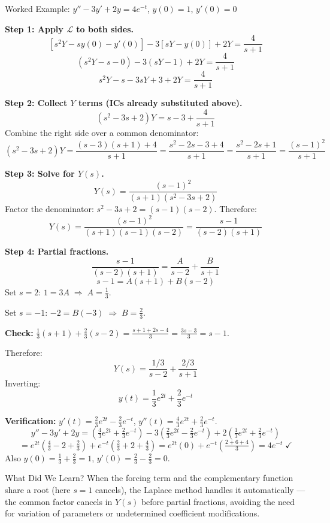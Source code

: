 \documentclass[12pt,a4paper]{article}
\begin{document}
\begin{infobox}{Worked Example: $y'' - 3y' + 2y = 4e^{-t}$, $y(0)=1$, $y'(0)=0$}

\textbf{Step 1: Apply $\mathcal{L}$ to both sides.}
\[
[s^2Y - sy(0) - y'(0)] - 3[sY - y(0)] + 2Y = \frac{4}{s+1}
\]
\[
(s^2Y - s - 0) - 3(sY - 1) + 2Y = \frac{4}{s+1}
\]
\[
s^2Y - s - 3sY + 3 + 2Y = \frac{4}{s+1}
\]

\textbf{Step 2: Collect $Y$ terms (ICs already substituted above).}
\[
(s^2 - 3s + 2)Y = s - 3 + \frac{4}{s+1}
\]
Combine the right side over a common denominator:
\[
(s^2-3s+2)Y = \frac{(s-3)(s+1) + 4}{s+1} = \frac{s^2-2s-3+4}{s+1} = \frac{s^2-2s+1}{s+1} = \frac{(s-1)^2}{s+1}
\]

\textbf{Step 3: Solve for $Y(s)$.}
\[
Y(s) = \frac{(s-1)^2}{(s+1)(s^2-3s+2)}
\]
Factor the denominator: $s^2-3s+2 = (s-1)(s-2)$. Therefore:
\[
Y(s) = \frac{(s-1)^2}{(s+1)(s-1)(s-2)} = \frac{s-1}{(s-2)(s+1)}
\]

\textbf{Step 4: Partial fractions.}
\[
\frac{s-1}{(s-2)(s+1)} = \frac{A}{s-2} + \frac{B}{s+1}
\]
\[
s-1 = A(s+1) + B(s-2)
\]
Set $s=2$: $1 = 3A \;\Rightarrow\; A = \tfrac{1}{3}$.

Set $s=-1$: $-2 = B(-3) \;\Rightarrow\; B = \tfrac{2}{3}$.

\textbf{Check:} $\tfrac{1}{3}(s+1)+\tfrac{2}{3}(s-2) = \tfrac{s+1+2s-4}{3} = \tfrac{3s-3}{3}=s-1$. \checkmark

Therefore:
\[
Y(s) = \frac{1/3}{s-2} + \frac{2/3}{s+1}
\]
Inverting:
\[
\boxed{y(t) = \frac{1}{3}e^{2t} + \frac{2}{3}e^{-t}}
\]

\textbf{Verification:}
$y'(t) = \tfrac{2}{3}e^{2t} - \tfrac{2}{3}e^{-t}$, \quad $y''(t) = \tfrac{4}{3}e^{2t}+\tfrac{2}{3}e^{-t}$.
\[
y''-3y'+2y = \left(\tfrac{4}{3}e^{2t}+\tfrac{2}{3}e^{-t}\right) - 3\left(\tfrac{2}{3}e^{2t}-\tfrac{2}{3}e^{-t}\right) + 2\left(\tfrac{1}{3}e^{2t}+\tfrac{2}{3}e^{-t}\right)
\]
\[
= e^{2t}\!\left(\tfrac{4}{3}-2+\tfrac{2}{3}\right) + e^{-t}\!\left(\tfrac{2}{3}+2+\tfrac{4}{3}\right)
= e^{2t}(0) + e^{-t}\!\left(\tfrac{2+6+4}{3}\right)
= 4e^{-t} \;\checkmark
\]
Also $y(0)=\tfrac{1}{3}+\tfrac{2}{3}=1$, $y'(0)=\tfrac{2}{3}-\tfrac{2}{3}=0$. \checkmark
\end{infobox}

\begin{learnbox}{What Did We Learn?}
When the forcing term and the complementary function share a root (here $s=1$ cancels),
the Laplace method handles it automatically --- the common factor cancels in $Y(s)$
before partial fractions, avoiding the need for variation of parameters or undetermined
coefficient modifications.
\end{learnbox}
\end{document}
